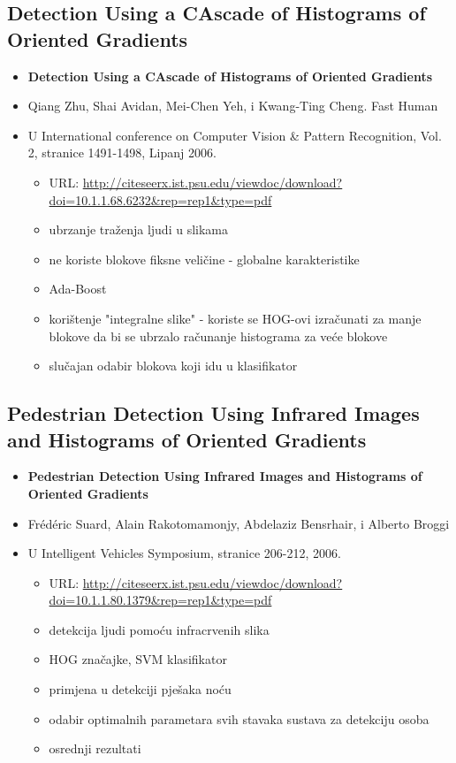 \documentclass[times, utf8, seminar, numeric]{fer}
\begin{document}
\subsection{Detection Using a CAscade of Histograms of Oriented Gradients}
\begin{itemize}
\item \textbf{Detection Using a CAscade of Histograms of Oriented Gradients}
\item Qiang Zhu, Shai Avidan, Mei-Chen Yeh, i Kwang-Ting Cheng. Fast Human 
\item U International conference on Computer Vision \& Pattern Recognition, Vol. 2, stranice 1491-1498, Lipanj 2006. 
	\begin{itemize}
		\item URL: \url{http://citeseerx.ist.psu.edu/viewdoc/download?doi=10.1.1.68.6232&rep=rep1&type=pdf}
		\item ubrzanje traženja ljudi u slikama
		\item ne koriste blokove fiksne veličine - globalne karakteristike
		\item Ada-Boost
		\item korištenje "integralne slike" - koriste se HOG-ovi izračunati za manje blokove da bi se ubrzalo računanje histograma za veće blokove
		\item slučajan odabir blokova koji idu u klasifikator
	\end{itemize}
\end{itemize}

\subsection{Pedestrian Detection Using Infrared Images and Histograms of Oriented Gradients}
\begin{itemize}
\item \textbf{Pedestrian Detection Using Infrared Images and Histograms of Oriented Gradients}
\item Frédéric Suard, Alain Rakotomamonjy, Abdelaziz Bensrhair, i Alberto Broggi
\item U Intelligent Vehicles Symposium, stranice 206-212, 2006. 
\begin{itemize}
	\item URL: \url{http://citeseerx.ist.psu.edu/viewdoc/download?doi=10.1.1.80.1379&rep=rep1&type=pdf}
	\item detekcija ljudi pomoću infracrvenih slika
	\item HOG značajke, SVM klasifikator
	\item primjena u detekciji pješaka noću
	\item odabir optimalnih parametara svih stavaka sustava za detekciju osoba
	\item osrednji rezultati
\end{itemize}
\end{itemize}
\end{document}
